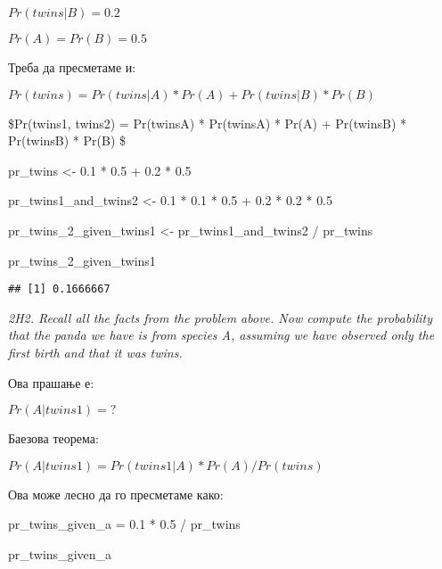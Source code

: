 \documentclass[
]{book}
\newenvironment{Shaded}{\begin{snugshade}}{\end{snugshade}}
\newcommand{\FloatTok}[1]{\textcolor[rgb]{0.00,0.00,0.81}{#1}}
\newcommand{\NormalTok}[1]{#1}
\newcommand{\OtherTok}[1]{\textcolor[rgb]{0.56,0.35,0.01}{#1}}
\newcommand{\SpecialCharTok}[1]{\textcolor[rgb]{0.00,0.00,0.00}{#1}}
\begin{document}
\(Pr(twins|B) = 0.2\)

\(Pr(A) = Pr(B) = 0.5\)

Треба да пресметаме и:

\(Pr(twins) = Pr(twins|A)*Pr(A) + Pr(twins|B)*Pr(B)\)

\$Pr(twins1, twins2) = Pr(twins\textbar A) * Pr(twins\textbar A) * Pr(A) + Pr(twins\textbar B) * Pr(twins\textbar B) * Pr(B) \$

\begin{Shaded}
\begin{Highlighting}[]
\NormalTok{pr\_twins }\OtherTok{\textless{}{-}} \FloatTok{0.1} \SpecialCharTok{*} \FloatTok{0.5} \SpecialCharTok{+} \FloatTok{0.2} \SpecialCharTok{*} \FloatTok{0.5}

\NormalTok{pr\_twins1\_and\_twins2 }\OtherTok{\textless{}{-}} \FloatTok{0.1} \SpecialCharTok{*} \FloatTok{0.1} \SpecialCharTok{*} \FloatTok{0.5} \SpecialCharTok{+} \FloatTok{0.2} \SpecialCharTok{*} \FloatTok{0.2} \SpecialCharTok{*} \FloatTok{0.5} 

\NormalTok{pr\_twins\_2\_given\_twins1 }\OtherTok{\textless{}{-}}\NormalTok{ pr\_twins1\_and\_twins2 }\SpecialCharTok{/}\NormalTok{ pr\_twins}

\NormalTok{pr\_twins\_2\_given\_twins1}
\end{Highlighting}
\end{Shaded}

\begin{verbatim}
## [1] 0.1666667
\end{verbatim}

\emph{2H2. Recall all the facts from the problem above. Now compute the probability that the panda we have is from species A, assuming we have observed only the first birth and that it was twins.}

Ова прашање е:

\(Pr(A|twins1) = ?\)

Баезова теорема:

\(Pr(A|twins1) = Pr(twins1|A) * Pr(A) / Pr(twins)\)

Ова може лесно да го пресметаме како:

\begin{Shaded}
\begin{Highlighting}[]
\NormalTok{pr\_twins\_given\_a }\OtherTok{=} \FloatTok{0.1} \SpecialCharTok{*} \FloatTok{0.5} \SpecialCharTok{/}\NormalTok{ pr\_twins}

\NormalTok{pr\_twins\_given\_a}
\end{Highlighting}
\end{Shaded}
\end{document}
